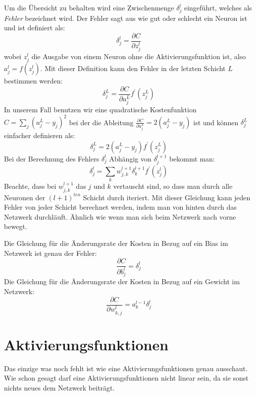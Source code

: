 \documentclass[12pt,a4paper]{report}
\begin{document}
Um die Übersicht zu behalten wird eine Zwischenmenge $\delta^l_j$ eingeführt, welches als \textit{Fehler} bezeichnet wird.
Der Fehler sagt aus wie gut oder schlecht ein Neuron ist und ist definiert als:
\[\delta^l_j = \frac{\partial C}{\partial z^l_j}\]
wobei $z^l_j$ die Ausgabe von einem Neuron ohne die Aktivierungsfunktion ist, also $a^l_j = f(z^l_j)$.
Mit dieser Definition kann den Fehler in der letzten Schicht $L$ bestimmen werden:
\[\delta^L_j = \frac{\partial C}{\partial a^L_j}f^\prime(z^L_j)\]
In unserem Fall benutzen wir eine quadratische Kostenfunktion $C = \sum_{j}(a^L_j - y_j)^2$ bei
der die Ableitung $\frac{\partial C}{\partial a^L_j} = 2(a^L_j - y_j)$ ist und können $\delta^L_j$ einfacher definieren als:
\[\delta^L_j = 2(a^L_j - y_j)f^\prime(z^L_j)\]
Bei der Berechnung des Fehlers $\delta^l_j$ Abhängig von $\delta^{l+1}_j$ bekommt man:
\[\delta^l_j = \sum_k w^{l+1}_{j,k}\delta^{l+1}_k f^\prime(z^l_j)\]
Beachte, dass bei $w^{l+1}_{j,k}$ das $j$ und $k$ vertauscht sind, so dass man durch alle Neuronen der $(l+1)^{ten}$ Schicht durch iteriert.
Mit dieser Gleichung kann jeden Fehler von jeder Schicht berechnet werden, indem man von hinten durch das Netzwerk durchläuft.
Ähnlich wie wenn man sich beim Netzwerk nach vorne bewegt.

Die Gleichung für die Änderungsrate der Kosten in Bezug auf ein Bias im Netzwerk ist genau der Fehler:
\[\frac{\partial C}{\partial b^l_j} = \delta^l_j\]
Die Gleichung für die Änderungsrate der Kosten in Bezug auf ein Gewicht im Netzwerk:
\[\frac{\partial C}{\partial w^{l}_{k,j}} = a^{l-1}_k\delta^l_j\]

\section{Aktivierungsfunktionen}\label{sec:aktivierungsfunktionen}
Das einzige was noch fehlt ist wie eine Aktivierungsfunktionen genau ausschaut.
Wie schon gesagt darf eine Aktivierungsfunktionen nicht linear sein, da sie sonst nichts neues dem Netzwerk beiträgt.
\end{document}
